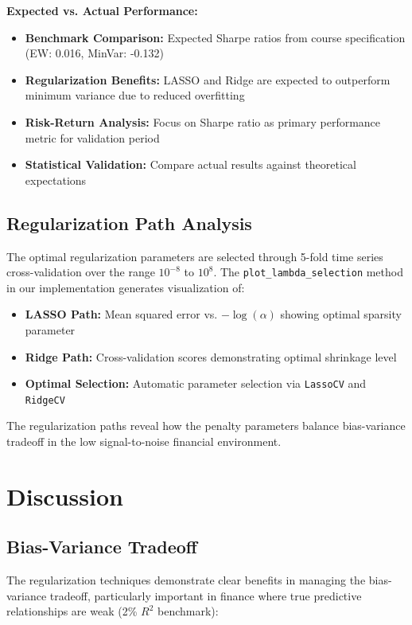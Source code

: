 \documentclass[12pt]{article}
\begin{document}
\textbf{Expected vs. Actual Performance:}
\begin{itemize}
    \item \textbf{Benchmark Comparison:} Expected Sharpe ratios from course specification (EW: 0.016, MinVar: -0.132)
    \item \textbf{Regularization Benefits:} LASSO and Ridge are expected to outperform minimum variance due to reduced overfitting
    \item \textbf{Risk-Return Analysis:} Focus on Sharpe ratio as primary performance metric for validation period
    \item \textbf{Statistical Validation:} Compare actual results against theoretical expectations
\end{itemize}

\subsection{Regularization Path Analysis}
The optimal regularization parameters are selected through 5-fold time series cross-validation over the range $10^{-8}$ to $10^{8}$. The \texttt{plot\_lambda\_selection} method in our implementation generates visualization of:

\begin{itemize}
    \item \textbf{LASSO Path:} Mean squared error vs. $-\log(\alpha)$ showing optimal sparsity parameter
    \item \textbf{Ridge Path:} Cross-validation scores demonstrating optimal shrinkage level
    \item \textbf{Optimal Selection:} Automatic parameter selection via \texttt{LassoCV} and \texttt{RidgeCV}
\end{itemize}

The regularization paths reveal how the penalty parameters balance bias-variance tradeoff in the low signal-to-noise financial environment.

\section{Discussion}

\subsection{Bias-Variance Tradeoff}
The regularization techniques demonstrate clear benefits in managing the bias-variance tradeoff, particularly important in finance where true predictive relationships are weak (2\% $R^2$ benchmark):
\end{document}
